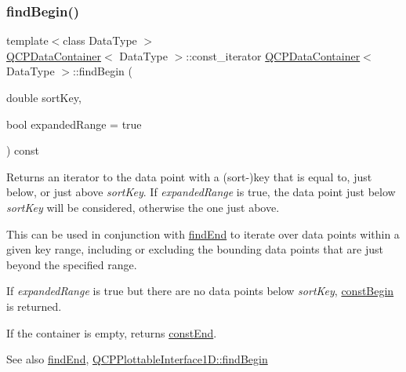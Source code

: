 \subsubsection{\texorpdfstring{find\+Begin()}{findBegin()}}
{\footnotesize\ttfamily template$<$class Data\+Type $>$ \\
\mbox{\hyperlink{class_q_c_p_data_container}{Q\+C\+P\+Data\+Container}}$<$ Data\+Type $>$\+::const\+\_\+iterator \mbox{\hyperlink{class_q_c_p_data_container}{Q\+C\+P\+Data\+Container}}$<$ Data\+Type $>$\+::find\+Begin (\begin{DoxyParamCaption}\item[{double}]{sort\+Key,  }\item[{bool}]{expanded\+Range = {\ttfamily true} }\end{DoxyParamCaption}) const}

Returns an iterator to the data point with a (sort-\/)key that is equal to, just below, or just above {\itshape sort\+Key}. If {\itshape expanded\+Range} is true, the data point just below {\itshape sort\+Key} will be considered, otherwise the one just above.

This can be used in conjunction with \mbox{\hyperlink{class_q_c_p_data_container_afb8b8f23cc2b7234a793a25ce79fe48f}{find\+End}} to iterate over data points within a given key range, including or excluding the bounding data points that are just beyond the specified range.

If {\itshape expanded\+Range} is true but there are no data points below {\itshape sort\+Key}, \mbox{\hyperlink{class_q_c_p_data_container_a49d7622999e2de67fa2331626a3159aa}{const\+Begin}} is returned.

If the container is empty, returns \mbox{\hyperlink{class_q_c_p_data_container_aa7f7cf239b85b1a28de3d675cc5b3da1}{const\+End}}.

\begin{DoxySeeAlso}{See also}
\mbox{\hyperlink{class_q_c_p_data_container_afb8b8f23cc2b7234a793a25ce79fe48f}{find\+End}}, \mbox{\hyperlink{class_q_c_p_plottable_interface1_d_a5b95783271306a4de97be54eac1e7d13}{Q\+C\+P\+Plottable\+Interface1\+D\+::find\+Begin}} 
\end{DoxySeeAlso}
\mbox{\label{class_q_c_p_data_container_afb8b8f23cc2b7234a793a25ce79fe48f}} 
